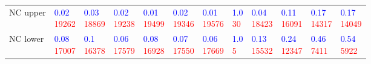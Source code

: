 \begin{tabular}{llllllllllll}
NC upper    &  \makecell{\textcolor{blue}{0.02} \\ \textcolor{red}{19262}} &  \makecell{\textcolor{blue}{0.03} \\ \textcolor{red}{18869}} &  \makecell{\textcolor{blue}{0.02} \\ \textcolor{red}{19238}} &  \makecell{\textcolor{blue}{0.01} \\ \textcolor{red}{19499}} &  \makecell{\textcolor{blue}{0.02} \\ \textcolor{red}{19346}} &  \makecell{\textcolor{blue}{0.01} \\ \textcolor{red}{19576}} &    \makecell{\textcolor{blue}{1.0} \\ \textcolor{red}{30}} &  \makecell{\textcolor{blue}{0.04} \\ \textcolor{red}{18423}} &  \makecell{\textcolor{blue}{0.11} \\ \textcolor{red}{16091}} &  \makecell{\textcolor{blue}{0.17} \\ \textcolor{red}{14317}} &  \makecell{\textcolor{blue}{0.17} \\ \textcolor{red}{14049}} \\
NC lower    &  \makecell{\textcolor{blue}{0.08} \\ \textcolor{red}{17007}} &   \makecell{\textcolor{blue}{0.1} \\ \textcolor{red}{16378}} &  \makecell{\textcolor{blue}{0.06} \\ \textcolor{red}{17579}} &  \makecell{\textcolor{blue}{0.08} \\ \textcolor{red}{16928}} &  \makecell{\textcolor{blue}{0.07} \\ \textcolor{red}{17550}} &  \makecell{\textcolor{blue}{0.06} \\ \textcolor{red}{17669}} &     \makecell{\textcolor{blue}{1.0} \\ \textcolor{red}{5}} &  \makecell{\textcolor{blue}{0.13} \\ \textcolor{red}{15532}} &  \makecell{\textcolor{blue}{0.24} \\ \textcolor{red}{12347}} &   \makecell{\textcolor{blue}{0.46} \\ \textcolor{red}{7411}} &   \makecell{\textcolor{blue}{0.54} \\ \textcolor{red}{5922}} \\

\end{tabular}
